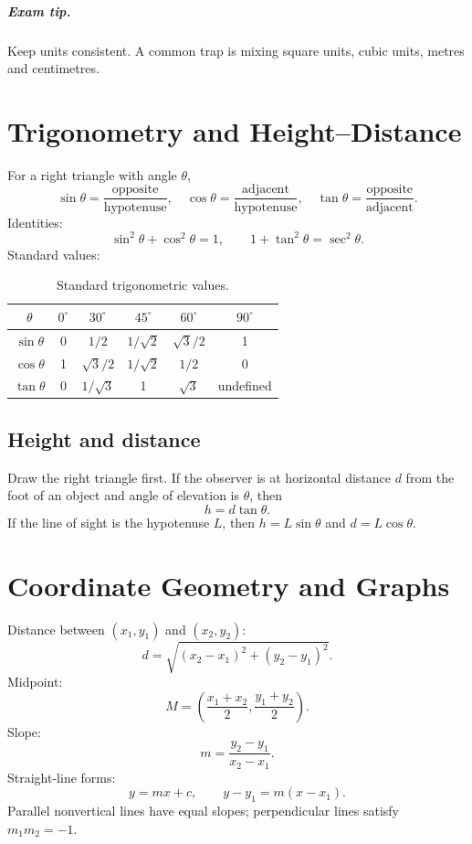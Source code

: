 \documentclass[12pt,a4paper,oneside]{book}
\newcommand{\tip}[1]{\paragraph{Exam tip.} #1}
\begin{document}
\tip{Keep units consistent. A common trap is mixing square units, cubic units, metres and centimetres.}

\chapter[Trigonometry and Height--Distance]{Trigonometry and Height--Distance}
For a right triangle with angle \(\theta\),
\[\sin\theta=\frac{\text{opposite}}{\text{hypotenuse}},\quad
\cos\theta=\frac{\text{adjacent}}{\text{hypotenuse}},\quad
\tan\theta=\frac{\text{opposite}}{\text{adjacent}}.\]
Identities:
\[\sin^2\theta+\cos^2\theta=1,\qquad
1+\tan^2\theta=\sec^2\theta.\]
Standard values:
\begin{table}[htbp]
\centering
\caption{Standard trigonometric values.}
\label{tab:trig}
\begin{tabular}{@{}c|ccccc@{}}
\toprule
\(\theta\) & \(0^\circ\) & \(30^\circ\) & \(45^\circ\) & \(60^\circ\) & \(90^\circ\) \\
\midrule
\(\sin\theta\) & 0 & \(1/2\) & \(1/\sqrt2\) & \(\sqrt3/2\) & 1 \\
\(\cos\theta\) & 1 & \(\sqrt3/2\) & \(1/\sqrt2\) & \(1/2\) & 0 \\
\(\tan\theta\) & 0 & \(1/\sqrt3\) & 1 & \(\sqrt3\) & undefined \\
\bottomrule
\end{tabular}
\end{table}

\section{Height and distance}
Draw the right triangle first. If the observer is at horizontal distance \(d\) from the foot of an object and angle of elevation is \(\theta\), then
\[h=d\tan\theta.\]
If the line of sight is the hypotenuse \(L\), then \(h=L\sin\theta\) and \(d=L\cos\theta\).

\chapter[Coordinate Geometry]{Coordinate Geometry and Graphs}
Distance between \((x_1,y_1)\) and \((x_2,y_2)\):
\[d=\sqrt{(x_2-x_1)^2+(y_2-y_1)^2}.\]
Midpoint:
\[M=\left(\frac{x_1+x_2}{2},\frac{y_1+y_2}{2}\right).\]
Slope:
\[m=\frac{y_2-y_1}{x_2-x_1}.\]
Straight-line forms:
\[y=mx+c,\qquad y-y_1=m(x-x_1).\]
Parallel nonvertical lines have equal slopes; perpendicular lines satisfy \(m_1m_2=-1\).
\end{document}
